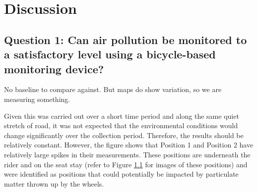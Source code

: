 \documentclass[11pt]{report}
\begin{document}
%




\chapter{Discussion} \label{chap: discussion}

\section{Question 1: Can air pollution be monitored to a satisfactory level using a bicycle-based monitoring device?}

No baseline to compare against. But maps do show variation, so we are measuring something.

Given this was carried out over a short time period and along the same quiet stretch of road, it was not expected that the environmental conditions would change significantly over the collection period. Therefore, the results should be relatively constant. However, the figure shows that Position 1 and Position 2 have relatively large spikes in their measurements. These positions are underneath the rider and on the seat stay (refer to Figure \ref{} for images of these positions) and were identified as positions that could potentially be impacted by particulate matter thrown up by the wheels.
\end{document}
